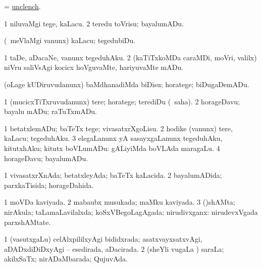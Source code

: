 \bentry
{} 
\gl{\kirx}
\expl{}
\bmng
= \hyperlink{unclench}{unclench}. 
\emng
\eentry

\bentry
{} 
\gl{\sakirx}
\expl{}
\bmng
\bnum
\num{1} niluvaMgi tege, kaLacu. 
\num{2} teredu toVrisu; bayalumADu. 
\enum
\emng

\noindent 
\gl{\akirx}
\bmng
(\sA\ meVlaMgi \mo vanunx) kaLacu; tegedubiDu. 
\emng
\eentry

\bentry
{} 
\gl{\sakirx}
\bmng
\bnum
\num{1} taDe, aDacaNe, \mo vanunx tegeduhAku. 
\num{2} (kaTiTxkoMDa caraMDi, moVri, \mo valilx) niVru saliVsAgi kocicx hoVguvaMte, hariyuvaMte mADu. 
\enum
\emng
\eentry

\bentry
{} 
\gl{\sakirx}
\expl{}
\bmng
(oLage kUDiruvudanunx) baMdhanadiMda biDisu; horatege; biDugaDemADu. 
\emng
\eentry

\bentry
{} 
\gl{\sakirx}
\expl{}
\bmng
\bnum
\num{1} (mucicxTiTxruvudanunx) tere; horatege; terediDu (\akirx\ saha). 
\num{2} horageDavu; bayalu mADu; raTuTxmADu. 
\enum
\emng
\eentry

\bentry
{} 
\gl{\sakirx}
\expl{}
\bmng
\bnum
\num{1} betatxlemADu; baTeTx tege; vivasatxrXgoLisu. 
\num{2} hodike (\mo vanunx) tere, kaLacu; tegeduhAku. 
\num{3} elegaLanunx yA sasayxgaLanunx tegeduhAku, kitutxhAku; kitutx boVLumADu:  gALiyiMda boVLAda maragaLu. 
\num{4} horageDavu; bayalumADu. 
\enum
\emng
\eentry

\bentry
{} 
\gl{\gu}
\expl{}
\bmng
\bnum
\num{1} vivasatxrXnAda; betatxleyAda; baTeTx kaLacida. 
\num{2} bayalumADida; parxkaTisida; horageDahida. 
\enum
\emng
\eentry

\bentry
{} 
\gl{\gu}
\expl{}
\bmng
\bnum
\num{1} moVDa kaviyada. 
\num{2} mabaubx musukada; maMku kaviyada. 
\num{3} (\parx)shAMta; nirAkula; taLamaLavilalxda; koSxVBegoLagAgada; nirudivxganx:  nirudevxVgada parxshAMtate. 
\enum
\emng
\eentry

\bentry
{} 
\gl{\gu}
\expl{}
\bmng
\bnum
\num{1} (vasutxgaLu) celAlxpililxyAgi bididxrada; asatxvayxsatxvAgi, aDADxdiDiDxyAgi -- esedirada, aDacirada. 
\num{2} (sheYli \mo vugaLa \vi) saraLa; akilxSaTx; nirADaMbarada; QujuvAda. 
\enum
\emng
\eentry

